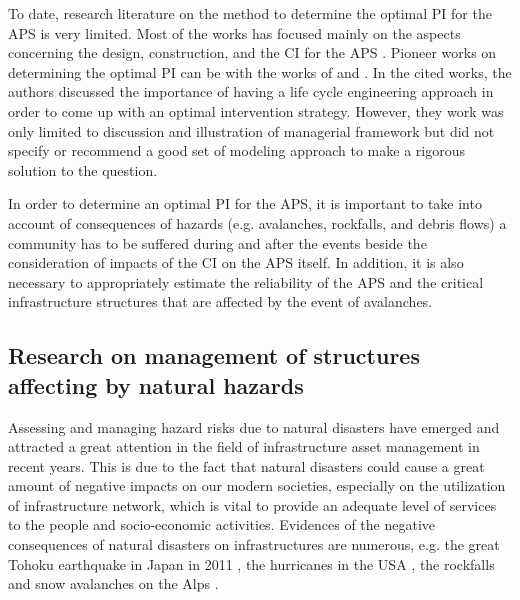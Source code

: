 \documentclass[fleqn]{article}
\begin{document}
To date, research literature on the method to determine the optimal PI for the APS is very limited. Most of the works has focused mainly on the aspects concerning the design, construction, and the CI for the APS \citep{Agerer2007,Rudolf-Miklau2008,Rudolf-Miklau2011,Margreth2007,ONR2010}. Pioneer works on determining the optimal PI can be with the works of \cite{Rudolf-Miklau2008} and \cite{Rudolf-Miklau2011}. In the cited works, the authors discussed the importance of having a life cycle engineering approach in order to come up with an optimal intervention strategy. However, they work was only limited to discussion and illustration of managerial framework but did not specify or recommend a good set of modeling approach to make a rigorous solution to the question. 

In order to determine an optimal PI for the APS, it is important to take into account of consequences of hazards (e.g. avalanches, rockfalls, and debris flows) a community has to be suffered during and after the events beside the consideration of impacts of the CI on the APS itself. In addition, it is also necessary to appropriately estimate the reliability of the APS and the critical infrastructure structures that are affected by the event of avalanches. %

\subsection{Research on management of structures affecting by natural hazards}
Assessing and managing hazard risks due to natural disasters have emerged and attracted a great attention in the field of infrastructure asset management in recent years. This is due to the fact that natural disasters could cause a great amount of negative impacts on our modern societies, especially on the utilization of infrastructure network, which is vital to provide an adequate level of services to the people and socio-economic activities. Evidences of the negative consequences of natural disasters on infrastructures are numerous, e.g. the great Tohoku earthquake in Japan in 2011 \citep{Nishiyama2012}, the hurricanes in the USA \citep{Cruz2008,Kates2006,Litman2006}, the rockfalls and snow avalanches on the Alps \citep{Perret2006, Stoffel2005}. 
\end{document}
